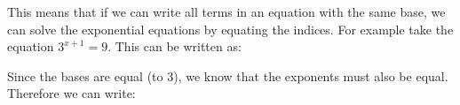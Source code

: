         \label{m39253*id155290}This means that if we can write all terms in an equation with the same base, we
can solve the exponential equations by equating the indices. For example take
the equation \begin{math}{3}^{x+1}=9\end{math}. This can be written as:\par 
        \label{m39253*id155321}\nopagebreak\noindent{}
    
        
        \label{m39253*id155355}Since the bases are equal (to 3), we know that the exponents must also be equal.
Therefore we can write:\par 
        \label{m39253*id155361}\nopagebreak\noindent{}
    

